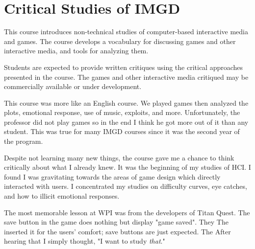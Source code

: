 \section{Critical Studies of IMGD}

\begin{meta}
\end{meta}


\coursedesc
This course introduces non-technical studies of computer-based
interactive media and games. The course develops a vocabulary for
discussing games and other interactive media, and tools for analyzing
them.

Students are expected to provide written critiques using the critical
approaches presented in the course. The games and other interactive
media critiqued may be commercially available or under development.


\courseself
This course was more like an English course. We played games then
analyzed the plots, emotional response, use of music, exploits, and
more. Unfortunately, the professor did not play games so in the end I
think he got more out of it than any student. This was true for many
IMGD courses since it was the second year of the program.

Despite not learning many new things, the course gave me a chance to
think critically about what I already knew. It was the beginning of
my studies of HCI. I found I was gravitating towards the areas of
game design which directly interacted with users. I concentrated my
studies on difficulty curves, eye catches, and how to illicit emotional
responses.

The most memorable lesson at WPI was from the developers of Titan Quest.
The save button in the game does nothing but display "game saved". They
The inserted it for the users' comfort; save buttons are just expected.
The After hearing that I simply thought, "I want to study \emph{that}."



